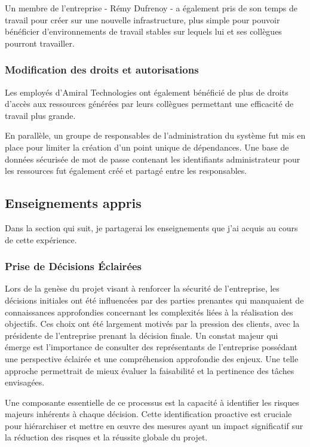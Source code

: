 Un membre de l'entreprise - Rémy Dufrenoy - a également pris de son temps de travail pour créer sur une nouvelle infrastructure, plus simple pour pouvoir bénéficier d'environnements de travail stables sur lequels lui et ses collègues pourront travailler.

\subsubsection{Modification des droits et autorisations}
Les employés d'Amiral Technologies ont également bénéficié de plus de droits d'accès aux ressources générées par leurs collègues permettant une efficacité de travail plus grande.

En parallèle, un groupe de responsables de l'administration du système fut mis en place pour limiter la création d'un point unique de dépendances.
Une base de données sécurisée de mot de passe contenant les identifiants administrateur pour les ressources fut également créé et partagé entre les responsables.

\subsection{Enseignements appris}
Dans la section qui suit, je partagerai les enseignements que j'ai acquis au cours de cette expérience.
\subsubsection{Prise de Décisions Éclairées}
Lors de la genèse du projet visant à renforcer la sécurité de l'entreprise, les décisions initiales ont été influencées par des parties prenantes qui manquaient de connaissances approfondies concernant les complexités liées à la réalisation des objectifs.
Ces choix ont été largement motivés par la pression des clients, avec la présidente de l'entreprise prenant la décision finale.
Un constat majeur qui émerge est l'importance de consulter des représentants de l'entreprise possédant une perspective éclairée et une compréhension approfondie des enjeux.
Une telle approche permettrait de mieux évaluer la faisabilité et la pertinence des tâches envisagées.

Une composante essentielle de ce processus est la capacité à identifier les risques majeurs inhérents à chaque décision.
Cette identification proactive est cruciale pour hiérarchiser et mettre en œuvre des mesures ayant un impact significatif sur la réduction des risques et la réussite globale du projet.

